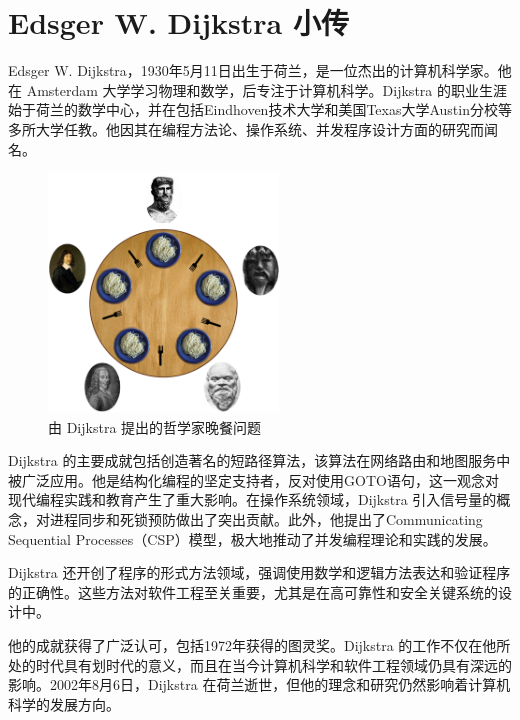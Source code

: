 \documentclass[a4paper,12pt]{article}
\begin{document}
\newpage

\section{Edsger W. Dijkstra 小传}

Edsger W. Dijkstra，1930年5月11日出生于荷兰，是一位杰出的计算机科学家。他在 Amsterdam 大学学习物理和数学，后专注于计算机科学。Dijkstra 的职业生涯始于荷兰的数学中心，并在包括Eindhoven技术大学和美国Texas大学Austin分校等多所大学任教。他因其在编程方法论、操作系统、并发程序设计方面的研究而闻名。

\begin{figure}[ht]
\centering
\includegraphics[height=2.5in]{images/dining_philosophers.png}
\caption{由 Dijkstra 提出的哲学家晚餐问题}
\end{figure}

Dijkstra 的主要成就包括创造著名的短路径算法，该算法在网络路由和地图服务中被广泛应用。他是结构化编程的坚定支持者，反对使用GOTO语句，这一观念对现代编程实践和教育产生了重大影响。在操作系统领域，Dijkstra 引入信号量的概念，对进程同步和死锁预防做出了突出贡献。此外，他提出了Communicating Sequential Processes（CSP）模型，极大地推动了并发编程理论和实践的发展。

Dijkstra 还开创了程序的形式方法领域，强调使用数学和逻辑方法表达和验证程序的正确性。这些方法对软件工程至关重要，尤其是在高可靠性和安全关键系统的设计中。

他的成就获得了广泛认可，包括1972年获得的图灵奖。Dijkstra 的工作不仅在他所处的时代具有划时代的意义，而且在当今计算机科学和软件工程领域仍具有深远的影响。2002年8月6日，Dijkstra 在荷兰逝世，但他的理念和研究仍然影响着计算机科学的发展方向。
\end{document}
